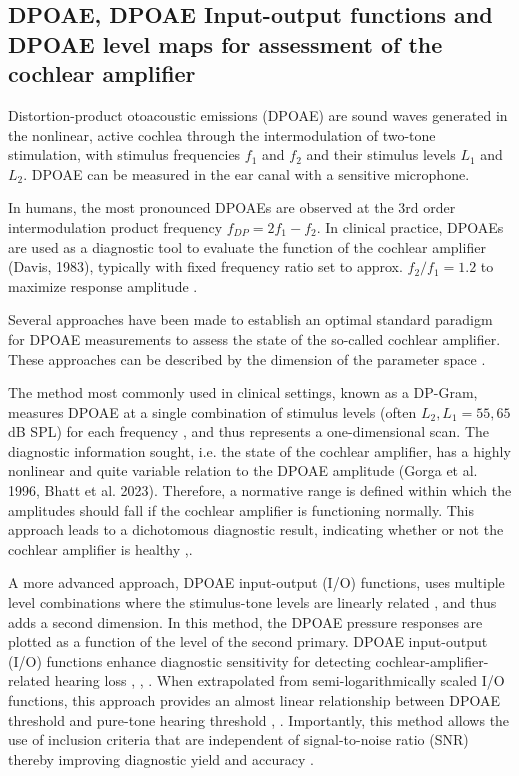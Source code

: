 \documentclass[journal,twoside,web]{ieeecolor2}
\begin{document}
\subsection{DPOAE, DPOAE Input-output functions and DPOAE level maps for assessment of the cochlear amplifier}
Distortion-product otoacoustic emissions (DPOAE) are sound waves generated in the nonlinear, active cochlea through the intermodulation of two-tone stimulation, with stimulus frequencies $f_1$ and $f_2$ and their stimulus levels $L_1$ and $L_2$.
DPOAE can be measured in the ear canal with a sensitive microphone.

In humans, the most pronounced DPOAEs are observed at the 3rd order intermodulation product frequency $f_{DP} = 2f_1 - f_2$.
In clinical practice, DPOAEs are used as a diagnostic tool to evaluate the function of the cochlear amplifier (Davis, 1983), typically with fixed frequency ratio set to approx. $f_2 / f_1 = 1.2$ to maximize response amplitude \cite{GK1990}.

Several approaches have been made to establish an optimal standard paradigm for DPOAE measurements to assess the state of the so-called cochlear amplifier.
These approaches can be described by the dimension of the parameter space \cite{Ms2002}.

The method most commonly used in clinical settings, known as a DP-Gram, measures DPOAE at a single combination of stimulus levels (often $L_2, L_1 = 55, 65$ dB SPL) for each frequency \cite{Ab2001}, and thus represents a one-dimensional scan.
The diagnostic information sought, i.e. the state of the cochlear amplifier, has a highly nonlinear and quite variable relation to the DPOAE amplitude (Gorga et al. 1996, Bhatt et al. 2023).
Therefore, a normative range is defined within which the amplitudes should fall if the cochlear amplifier is functioning normally.
This approach leads to a dichotomous diagnostic result, indicating whether or not the cochlear amplifier is healthy \cite{Pt1991},\cite{LM2003}.
 
A more advanced approach, DPOAE input-output (I/O) functions, uses multiple level combinations where the stimulus-tone levels are linearly related \cite{Km1998}, and thus adds a second dimension.
In this method, the DPOAE pressure responses are plotted as a function of the level of the second primary.
DPOAE input-output (I/O) functions enhance diagnostic sensitivity for detecting cochlear-amplifier-related hearing loss \cite{GK1990}, \cite{St1996}, \cite{GD2024}.
When extrapolated from semi-logarithmically scaled I/O functions, this approach provides an almost linear relationship between DPOAE threshold and pure-tone hearing threshold \cite{BJ2002}, \cite{GN2003}.
Importantly, this method allows the use of inclusion criteria that are independent of signal-to-noise ratio (SNR) thereby improving diagnostic yield and accuracy \cite{ZD2017}.
\end{document}
